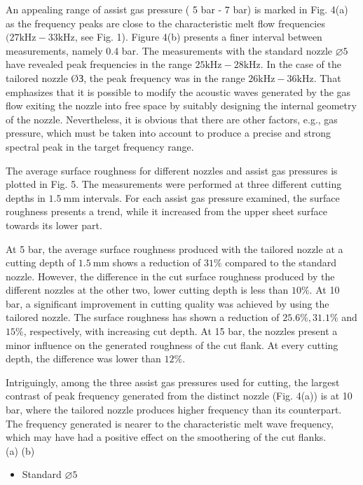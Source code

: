 \documentclass[10pt]{article}
\begin{document}
An appealing range of assist gas pressure ( 5 bar - 7 bar) is marked in Fig. 4(a) as the frequency peaks are close to the characteristic melt flow frequencies $(27 \mathrm{kHz}-33 \mathrm{kHz}$, see Fig. 1). Figure 4(b) presents a finer interval between measurements, namely 0.4 bar. The measurements with the standard nozzle $\varnothing 5$ have revealed peak frequencies in the range $25 \mathrm{kHz}-28 \mathrm{kHz}$. In the case of the tailored nozzle ØЗ, the peak frequency was in the range $26 \mathrm{kHz}-36 \mathrm{kHz}$. That emphasizes that it is possible to modify the acoustic waves generated by the gas flow exiting the nozzle into free space by suitably designing the internal geometry of the nozzle. Nevertheless, it is obvious that there are other factors, e.g., gas pressure, which must be taken into account to produce a precise and strong spectral peak in the target frequency range.

The average surface roughness for different nozzles and assist gas pressures is plotted in Fig. 5. The measurements were performed at three different cutting depths in $1.5 \mathrm{~mm}$ intervals. For each assist gas pressure examined, the surface roughness presents a trend, while it increased from the upper sheet surface towards its lower part.

At 5 bar, the average surface roughness produced with the tailored nozzle at a cutting depth of $1.5 \mathrm{~mm}$ shows a reduction of $31 \%$ compared to the standard nozzle. However, the difference in the cut surface roughness produced by the different nozzles at the other two, lower cutting depth is less than $10 \%$. At 10 bar, a significant improvement in cutting quality was achieved by using the tailored nozzle. The surface roughness has shown a reduction of $25.6 \%, 31.1 \%$ and $15 \%$, respectively, with increasing cut depth. At 15 bar, the nozzles present a minor influence on the generated roughness of the cut flank. At every cutting depth, the difference was lower than $12 \%$.

Intriguingly, among the three assist gas pressures used for cutting, the largest contrast of peak frequency generated from the distinct nozzle (Fig. 4(a)) is at 10 bar, where the tailored nozzle produces higher frequency than its counterpart. The frequency generated is nearer to the characteristic melt wave frequency, which may have had a positive effect on the smoothering of the cut flanks.\\
(a) (b)

\begin{itemize}
  \item Standard $\varnothing 5$
\end{itemize}
\end{document}
